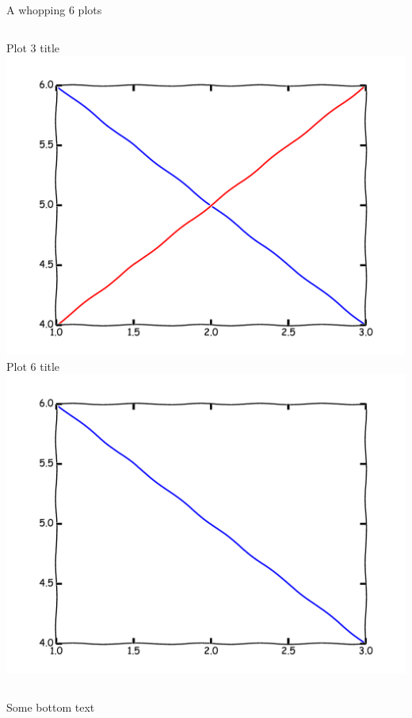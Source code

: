 \begin{frame}{A whopping 6 plots}
\begin{columns}
\begin{column}{0.33\textwidth}
\begin{center}
Plot 3 title
\\
\includegraphics[width=\textwidth]{example/plot3.pdf}
\\
Plot 6 title
\\
\includegraphics[width=\textwidth]{example/plot2.pdf}
\end{center}
\end{column}
\end{columns}
Some bottom text
\end{frame}

